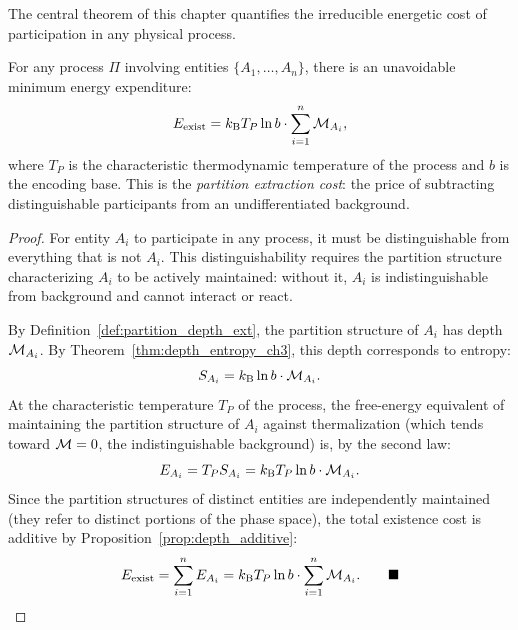The central theorem of this chapter quantifies the irreducible energetic cost
of participation in any physical process.

\begin{theorem}
\label{thm:existence_cost_ch3}
For any process $\Pi$ involving entities $\{A_1, \ldots, A_n\}$, there is an
unavoidable minimum energy expenditure:
\begin{equation}
  E_{\mathrm{exist}} = k_{\mathrm{B}} T_P \ln b \cdot \sum_{i=1}^{n} \mathcal{M}_{A_i},
  \label{eq:existence_cost}
\end{equation}
where $T_P$ is the characteristic thermodynamic temperature of the process and
$b$ is the encoding base. This is the \emph{partition extraction cost}: the
price of subtracting distinguishable participants from an undifferentiated
background.
\end{theorem}

\begin{proof}
For entity $A_i$ to participate in any process, it must be distinguishable
from everything that is not $A_i$. This distinguishability requires the
partition structure characterizing $A_i$ to be actively maintained: without it,
$A_i$ is indistinguishable from background and cannot interact or react.

By Definition~\ref{def:partition_depth_ext}, the partition structure of $A_i$
has depth $\mathcal{M}_{A_i}$. By Theorem~\ref{thm:depth_entropy_ch3}, this depth
corresponds to entropy:
\begin{equation}
  S_{A_i} = k_{\mathrm{B}} \ln b \cdot \mathcal{M}_{A_i}.
\end{equation}
At the characteristic temperature $T_P$ of the process, the free-energy
equivalent of maintaining the partition structure of $A_i$ against
thermalization (which tends toward $\mathcal{M} = 0$, the indistinguishable
background) is, by the second law:
\begin{equation}
  E_{A_i} = T_P S_{A_i} = k_{\mathrm{B}} T_P \ln b \cdot \mathcal{M}_{A_i}.
\end{equation}
Since the partition structures of distinct entities are independently
maintained (they refer to distinct portions of the phase space), the total
existence cost is additive by Proposition~\ref{prop:depth_additive}:
\begin{equation}
  E_{\mathrm{exist}} = \sum_{i=1}^{n} E_{A_i} = k_{\mathrm{B}} T_P \ln b \cdot \sum_{i=1}^{n} \mathcal{M}_{A_i}. \qquad\blacksquare
\end{equation}
\end{proof}

